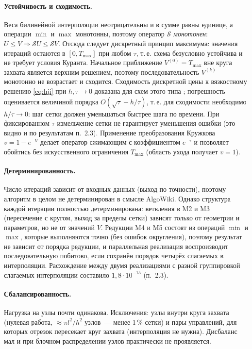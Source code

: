 \documentclass[14pt,a4paper]{extarticle}
\newcommand{\Tmax}{T_{\max}}
\begin{document}
\paragraph{Устойчивость и сходимость.}
Веса билинейной интерполяции неотрицательны и в сумме равны единице, а
операции $\min$ и $\max$ монотонны, поэтому оператор $\mathcal{S}$
\emph{монотонен}: $U\le V\Rightarrow\mathcal{S}U\le\mathcal{S}V$. Отсюда
следует дискретный принцип максимума: значения итераций остаются в
$[0,\Tmax]$ при любом $\tau$, т.\,е. схема безусловно устойчива и не
требует условия Куранта. Начальное приближение $V^{(0)}=\Tmax$ вне
круга захвата является верхним решением, поэтому последовательность
$V^{(k)}$ монотонно не возрастает и сходится.
Сходимость дискретной цены к вязкостному решению \eqref{eq:hji} при
$h,\tau\to 0$ доказана для схем этого типа \cite{bfs,bcd}; погрешность
оценивается величиной порядка $O(\sqrt{\tau}+h/\tau)$, т.\,е. для
сходимости необходимо $h/\tau\to 0$: шаг сетки должен уменьшаться
быстрее шага по времени. При фиксированном $\tau$ измельчение сетки
не гарантирует уменьшения ошибки (это видно и по результатам п.~2.3).
Применение преобразования Кружкова $v=1-e^{-V}$ делает оператор
сжимающим с коэффициентом $e^{-\tau}$ и позволяет обойтись без
искусственного ограничения $\Tmax$ (область ухода получает $v=1$).

\paragraph{Детерминированность.}
Число итераций зависит от входных данных (выход по точности), поэтому
алгоритм в целом не детерминирован в смысле AlgoWiki. Однако структура
каждой итерации полностью детерминирована: ветвления в M2 и M3
(пересечение с кругом, выход за пределы сетки) зависят только от
геометрии и параметров, но не от значений $V$. Редукции M4 и M5 состоят
из операций $\min$ и $\max$, которые выполняются точно (без ошибок
округления), поэтому результат не зависит от порядка редукции, и
параллельная реализация воспроизводит последовательную побитово, если
сохранён порядок четырёх слагаемых в интерполяции. Расхождение между
двумя реализациями с разной группировкой слагаемых интерполяции составило
$1{,}8\cdot10^{-15}$ (п.~2.3).

\paragraph{Сбалансированность.}
Нагрузка на узлы почти одинакова. Исключения: узлы внутри круга захвата
(нулевая работа, $\approx\pi l^2/h^2$ узлов~--- менее 1\,\% сетки) и
пары управлений, для которых отрезок пересекает круг захвата
(интерполяция не нужна). Дисбаланс мал и при блочном распределении
узлов практически не проявляется.
\end{document}
